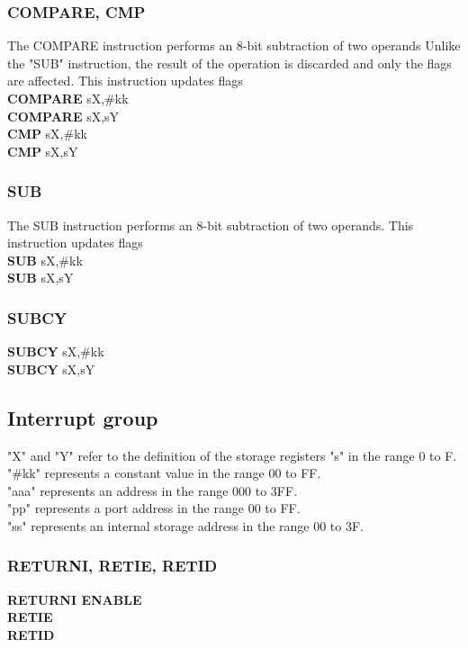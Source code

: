 {        \subsubsection{COMPARE, CMP}
            The COMPARE instruction performs an 8-bit subtraction of two operands Unlike the "SUB" instruction, the result of the operation is
            discarded and only the flags are affected. This instruction updates flags\\
            \textbf{COMPARE} sX,\#kk\\
            \textbf{COMPARE} sX,sY\\
            \textbf{CMP}     sX,\#kk\\
            \textbf{CMP}     sX,sY\\

        \subsubsection{SUB}
            The SUB instruction performs an 8-bit subtraction of two operands. This instruction updates flags\\
            \textbf{SUB} sX,\#kk\\
            \textbf{SUB} sX,sY\\
        \subsubsection{SUBCY}
            \textbf{SUBCY} sX,\#kk\\
            \textbf{SUBCY} sX,sY\\

        \subsection{Interrupt group}
            "X" and "Y" refer to the definition of the storage registers "s" in the range 0 to F.\\
            "\#kk" represents a constant value in the range 00 to FF.\\
            "aaa" represents an address in the range 000 to 3FF.\\
            "pp" represents a port address in the range 00 to FF.\\
            "ss" represents an internal storage address in the range 00 to 3F.\\
        \subsubsection{RETURNI, RETIE, RETID}
            \textbf{RETURNI ENABLE}\\
            \textbf{RETIE}\\
            \textbf{RETID}\\
}
